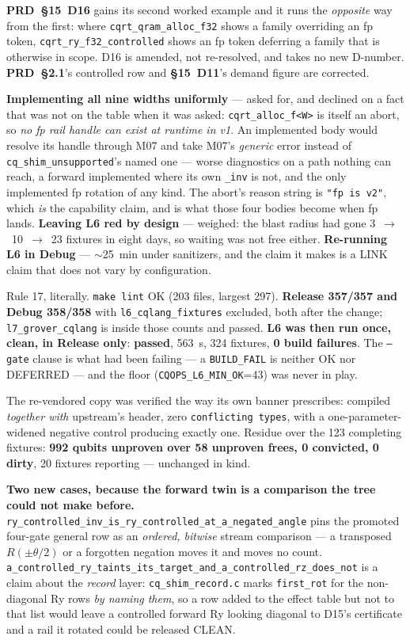 \textbf{PRD~§15~D16} gains its second worked example and it runs the
\emph{opposite} way from the first: where \texttt{cqrt\_qram\_alloc\_f32} shows a
family overriding an fp token, \texttt{cqrt\_ry\_f32\_controlled} shows an fp token
deferring a family that is otherwise in scope. D16 is amended, not re-resolved,
and takes no new D-number. \textbf{PRD~§2.1}'s controlled row and
\textbf{§15~D11}'s demand figure are corrected.

\textbf{Implementing all nine widths uniformly} --- asked for, and declined on a
fact that was not on the table when it was asked: \texttt{cqrt\_alloc\_f<W>} is
itself an abort, so \emph{no fp rail handle can exist at runtime in v1}. An
implemented body would resolve its handle through M07 and take M07's
\emph{generic} error instead of \texttt{cq\_shim\_unsupported}'s named one ---
worse diagnostics on a path nothing can reach, a forward implemented where its
own \texttt{\_inv} is not, and the only implemented fp rotation of any kind. The
abort's reason string is \texttt{"fp is v2"}, which \emph{is} the capability
claim, and is what those four bodies become when fp lands.
\textbf{Leaving L6 red by design} --- weighed: the blast radius had gone
3~$\to$~10~$\to$~23 fixtures in eight days, so waiting was not free either.
\textbf{Re-running L6 in Debug} --- $\sim$25~min under sanitizers, and the claim
it makes is a LINK claim that does not vary by configuration.

Rule 17, literally. \texttt{make lint} OK (203 files, largest 297).
\textbf{Release 357/357 and Debug 358/358} with \texttt{l6\_cqlang\_fixtures}
excluded, both after the change; \texttt{l7\_grover\_cqlang} is inside those
counts and passed. \textbf{L6 was then run once, clean, in Release only}:
\textbf{passed}, 563~s, 324 fixtures, \textbf{0 build failures}. The
\texttt{--gate} clause is what had been failing --- a \texttt{BUILD\_FAIL} is
neither OK nor DEFERRED --- and the floor (\texttt{CQOPS\_L6\_MIN\_OK}=43) was
never in play.

\medskip
\noindent The re-vendored copy was verified the way its own banner prescribes:
compiled \emph{together with} upstream's header, zero \texttt{conflicting types},
with a one-parameter-widened negative control producing exactly one. Residue over
the 123 completing fixtures: \textbf{992 qubits unproven over 58 unproven frees,
0 convicted, 0 dirty}, 20 fixtures reporting --- unchanged in kind.

\medskip
\noindent\textbf{Two new cases, because the forward twin is a comparison the
tree could not make before.}
\texttt{ry\_controlled\_inv\_is\_ry\_controlled\_at\_a\_negated\_angle} pins the
promoted four-gate general row as an \emph{ordered, bitwise} stream comparison
--- a transposed $R(\pm\theta/2)$ or a forgotten negation moves it and moves no
count. \texttt{a\_controlled\_ry\_taints\_its\_target\_and\_a\_controlled\_rz\_does\_not}
is a claim about the \emph{record} layer:
\texttt{cq\_shim\_record.c} marks \texttt{first\_rot} for the non-diagonal Ry rows
\emph{by naming them}, so a row added to the effect table but not to that list
would leave a controlled forward Ry looking diagonal to D15's certificate and a
rail it rotated could be released CLEAN.

